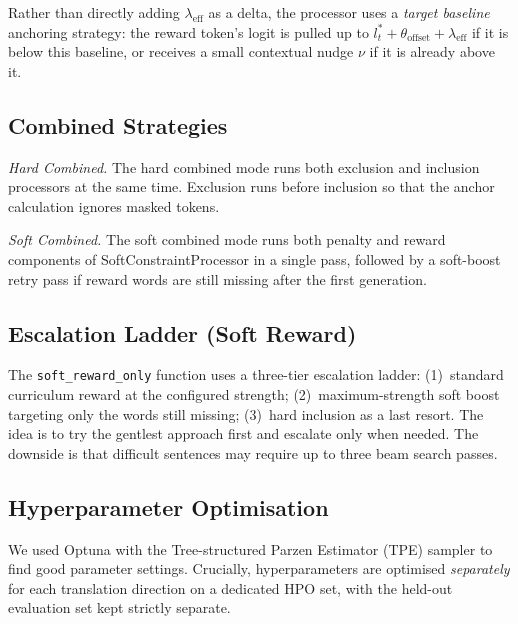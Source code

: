 \documentclass{CUP-JNL-NLP}
\begin{document}
Rather than directly adding $\lambda_{\text{eff}}$ as a delta, the processor uses a
\emph{target baseline} anchoring strategy: the reward token's logit is pulled up to
$l_t^{*} + \theta_{\text{offset}} + \lambda_{\text{eff}}$ if it is below this
baseline, or receives a small contextual nudge $\nu$ if it is already above it.

\subsection{Combined Strategies}

\textit{Hard Combined.} The hard combined mode runs both exclusion and inclusion
processors at the same time. Exclusion runs before inclusion so that the anchor
calculation ignores masked tokens.

\textit{Soft Combined.} The soft combined mode runs both penalty and reward
components of SoftConstraintProcessor in a single pass, followed by a soft-boost
retry pass if reward words are still missing after the first generation.

\subsection{Escalation Ladder (Soft Reward)}

The \texttt{soft\_reward\_only} function uses a three-tier escalation ladder:
(1)~standard curriculum reward at the configured strength; (2)~maximum-strength soft
boost targeting only the words still missing; (3)~hard inclusion as a last resort.
The idea is to try the gentlest approach first and escalate only when needed. The
downside is that difficult sentences may require up to three beam search passes.

\subsection{Hyperparameter Optimisation}

We used Optuna \citep{akiba2019optuna} with the Tree-structured Parzen Estimator
(TPE) sampler to find good parameter settings. Crucially, hyperparameters are
optimised \emph{separately} for each translation direction on a dedicated HPO set,
with the held-out evaluation set kept strictly separate.
\end{document}
